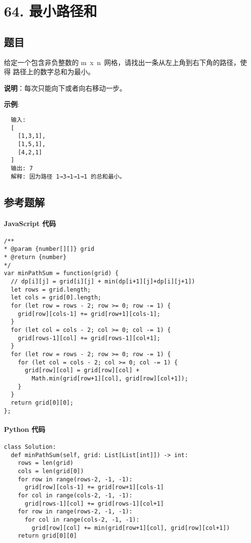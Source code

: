 \newpage
\section{64. 最小路径和}
\label{leetcode:64}

\subsection{题目}

给定一个包含非负整数的 m x n 网格，请找出一条从左上角到右下角的路径，使得
路径上的数字总和为最小。

\textbf{说明}：每次只能向下或者向右移动一步。

\textbf{示例}:

\begin{verbatim}
  输入:
  [
    [1,3,1],
    [1,5,1],
    [4,2,1]
  ]
  输出: 7
  解释: 因为路径 1→3→1→1→1 的总和最小。
\end{verbatim}

\subsection{参考题解}

\paragraph{JavaScript 代码}

\begin{verbatim}
/**
* @param {number[][]} grid
* @return {number}
*/
var minPathSum = function(grid) {
  // dp[i][j] = grid[i][j] + min(dp[i+1][j]+dp[i][j+1])
  let rows = grid.length;
  let cols = grid[0].length;
  for (let row = rows - 2; row >= 0; row -= 1) {
    grid[row][cols-1] += grid[row+1][cols-1];
  }
  for (let col = cols - 2; col >= 0; col -= 1) {
    grid[rows-1][col] += grid[rows-1][col+1];
  }
  for (let row = rows - 2; row >= 0; row -= 1) {
    for (let col = cols - 2; col >= 0; col -= 1) {
      grid[row][col] = grid[row][col] +
        Math.min(grid[row+1][col], grid[row][col+1]);
    }
  }
  return grid[0][0];
};
\end{verbatim}

\paragraph{Python 代码}

\begin{verbatim}
class Solution:
  def minPathSum(self, grid: List[List[int]]) -> int:
    rows = len(grid)
    cols = len(grid[0])
    for row in range(rows-2, -1, -1):
      grid[row][cols-1] += grid[row+1][cols-1]
    for col in range(cols-2, -1, -1):
      grid[rows-1][col] += grid[rows-1][col+1]
    for row in range(rows-2, -1, -1):
      for col in range(cols-2, -1, -1):
        grid[row][col] += min(grid[row+1][col], grid[row][col+1])
    return grid[0][0]
\end{verbatim}

